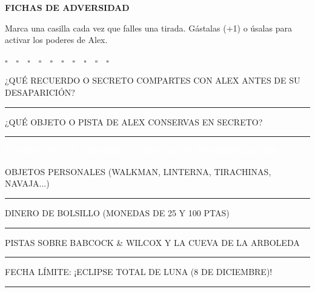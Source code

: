 \documentclass[10pt,a4paper,oneside]{book}
\newcommand{\field}[2][\linewidth]{%
  \begin{minipage}[t]{#1}
  \textcolor{InkSoft}{\terminalfont\scriptsize\MakeUppercase{#2}}\par
  \vspace{1.5mm}\textcolor{Line}{\rule{\linewidth}{0.45pt}}
  \end{minipage}}
\newcommand{\strip}[1]{%
  \vspace{1.5mm}\noindent
  \colorbox{CarbonSestao}{\parbox{\dimexpr\linewidth-2\fboxsep\relax}{%
    \textcolor{white}{\industrialfont\bfseries\small\MakeUppercase{#1}}}}\par
  \vspace{1.5mm}}
\begin{document}
\vspace{1mm}
\begin{minipage}[t]{0.35\linewidth}
  \textbf{\industrialfont\small FICHAS DE ADVERSIDAD}\par
  \vspace{1mm}
  {\scriptsize Marca una casilla cada vez que falles una tirada. Gástalas (+1) o úsalas para activar los poderes de Alex.}\par
  \vspace{2mm}
  \large $\square\quad\square\quad\square\quad\square\quad\square\quad\square\quad\square\quad\square\quad\square\quad\square$
\end{minipage}\hfill
\begin{minipage}[t]{0.60\linewidth}
  \field{¿Qué recuerdo o secreto compartes con Alex antes de su desaparición?}
  \vspace{4mm}
  \field{¿Qué objeto o pista de Alex conservas en secreto?}
\end{minipage}

\strip{Equipo en la Mochila y Notas de Investigación}

\vspace{1mm}
\begin{minipage}[t]{0.48\linewidth}
  \field{Objetos personales (Walkman, linterna, tirachinas, navaja...)}
  \vspace{4mm}
  \field{Dinero de bolsillo (monedas de 25 y 100 ptas)}
\end{minipage}\hfill
\begin{minipage}[t]{0.48\linewidth}
  \field{Pistas sobre Babcock \& Wilcox y la cueva de La Arboleda}
  \vspace{4mm}
  \field{Fecha límite: ¡Eclipse total de Luna (8 de diciembre)!}
\end{minipage}
\end{document}
